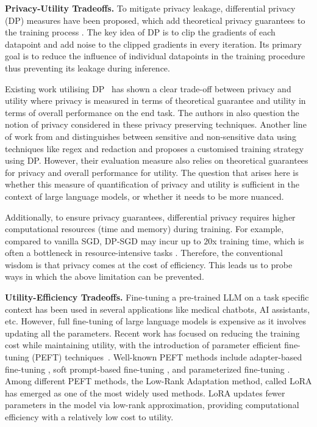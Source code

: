 \noindent
\textbf{Privacy-Utility Tradeoffs.}
To mitigate privacy leakage, differential privacy (DP) measures have been proposed, which add theoretical privacy guarantees to the training process \cite{10.1145/2976749.2978318}. The key idea of DP is to clip the gradients of each datapoint and add noise to the clipped gradients in every iteration.  Its primary goal is to reduce the influence of individual datapoints in the training procedure thus preventing its leakage during inference. 

Existing work utilising DP~\cite{yu2022differentiallyprivatefinetuninglanguage} has shown a clear trade-off between privacy and utility where privacy is measured in terms of theoretical guarantee and utility in terms of overall performance on the end task. The authors in \cite{10.1145/3531146.3534642} also question the notion of privacy considered in these privacy preserving techniques. Another line of work from \cite{ shi-etal-2022-selective} and \cite{zhao-etal-2022-provably} distinguishes between sensitive and non-sensitive data using techniques like regex and redaction and proposes a customised training strategy using DP. However, their evaluation measure also relies on theoretical guarantees for privacy and overall performance for utility. The question that arises here is whether this measure of quantification of privacy and utility is sufficient in the context of large language models, or whether it needs to be more nuanced.

Additionally, to ensure privacy guarantees, differential privacy requires higher computational resources (time and memory) during training. For example, compared to vanilla SGD, DP-SGD may incur up to $20$x training time, which is often a bottleneck in resource-intensive tasks \cite{dupuy2022efficient}. Therefore, the conventional wisdom is that privacy comes at the cost of efficiency. This leads us to probe ways in which the above limitation can be prevented.

\noindent
\textbf{Utility-Efficiency Tradeoffs.} Fine-tuning a pre-trained LLM on a task specific context has been used in several applications like medical chatbots, AI assistants, etc. However, full fine-tuning of large language models is expensive as it involves updating all the parameters. Recent work has focused on reducing the training cost while maintaining utility, with the introduction of parameter efficient fine-tuning (PEFT) techniques~\cite{han2024parameterefficientfinetuninglargemodels}. Well-known PEFT methods include adapter-based fine-tuning \cite{houlsby2019parameter, lei2023conditional, zhu2021counter, he2021towards}, soft prompt-based fine-tuning \cite{li2021prefix, li2023prefix, liu2021p, liu2024gpt, lester2021power}, and parameterized fine-tuning \cite{hu2022lora,liu2024dora}. Among different PEFT methods, the Low-Rank Adaptation method, called LoRA \cite{hu2022lora} has emerged as one of the most widely used methods. LoRA updates fewer parameters in the model via low-rank approximation, providing computational efficiency with a relatively low cost to utility.

